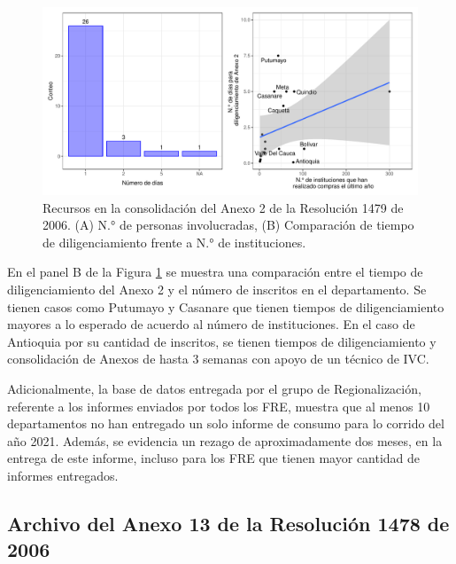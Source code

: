 \documentclass[
  oneside]{book}
\begin{document}
\begin{figure}[t!]

{\centering \includegraphics[width=1\linewidth]{InformeFinal_files/figure-latex/TiemposConsolidacionA2-1} 

}

\caption{Recursos en la consolidación del Anexo 2 de la Resolución 1479 de 2006. (A) N.° de personas involucradas, (B) Comparación de tiempo de diligenciamiento frente a N.° de instituciones.}\label{fig:TiemposConsolidacionA2}
\end{figure}

En el panel B de la Figura \ref{fig:TiemposConsolidacionA2} se muestra una comparación entre el tiempo de diligenciamiento del Anexo 2 y el número de inscritos en el departamento. Se tienen casos como Putumayo y Casanare que tienen tiempos de diligenciamiento mayores a lo esperado de acuerdo al número de instituciones. En el caso de Antioquia por su cantidad de inscritos, se tienen tiempos de diligenciamiento y consolidación de Anexos de hasta 3 semanas con apoyo de un técnico de IVC.

Adicionalmente, la base de datos entregada por el grupo de Regionalización, referente a los informes enviados por todos los FRE, muestra que al menos 10 departamentos no han entregado un solo informe de consumo para lo corrido del año 2021. Además, se evidencia un rezago de aproximadamente dos meses, en la entrega de este informe, incluso para los FRE que tienen mayor cantidad de informes entregados.

\hypertarget{archivo-del-anexo-13-de-la-resoluciuxf3n-1478-de-2006}{%
\subsection{Archivo del Anexo 13 de la Resolución 1478 de 2006}\label{archivo-del-anexo-13-de-la-resoluciuxf3n-1478-de-2006}}
\end{document}
